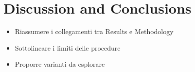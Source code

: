 \chapter{Discussion and Conclusions}

\begin{toDo}
	\begin{itemize}
		\item Riassumere i collegamenti tra Results e Methodology
		\item Sottolineare i limiti delle procedure
		\item Proporre varianti da esplorare
	\end{itemize}

\end{toDo}
